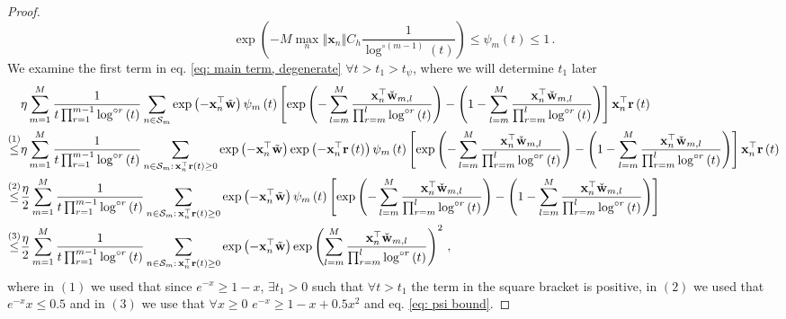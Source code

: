 \documentclass[twoside,11pt,english]{article}
\begin{document}
{\begin{proof}
\begin{equation}
\exp\left(-M\max_{n}\left\Vert \mathbf{x}_{n}\right\Vert C_{h}\frac{1}{\log^{\circ\left(m-1\right)}\left(t\right)}\right)\leq\psi_{m}\left(t\right)\leq1\,.\label{eq: psi bound}
\end{equation}
We examine the first term in eq. \ref{eq: main term, degenerate}
$\forall t>t_{1}>t_{\psi}$, where we will determine $t_{1}$ later
\begin{align*}
 & \eta\sum_{m=1}^{M}\frac{1}{t\prod_{r=1}^{m-1}\log^{\circ r}\left(t\right)}\sum_{n\in\mathcal{S}_{m}}\exp\left(-\mathbf{x}_{n}^{\top}\tilde{\mathbf{w}}\right)\psi_{m}\left(t\right)\left[\exp\left(-\sum_{l=m}^{M}\frac{\mathbf{x}_{n}^{\top}\check{\mathbf{w}}_{m,l}}{\prod_{r=m}^{l}\log^{\circ r}\left(t\right)}\right)-\left(1-\sum_{l=m}^{M}\frac{\mathbf{x}_{n}^{\top}\check{\mathbf{w}}_{m,l}}{\prod_{r=m}^{l}\log^{\circ r}\left(t\right)}\right)\right]\mathbf{x}_{n}^{\top}\mathbf{r}\left(t\right)\,\\
\overset{\left(1\right)}{\leq} & \eta\sum_{m=1}^{M}\frac{1}{t\prod_{r=1}^{m-1}\log^{\circ r}\left(t\right)}\sum_{n\in\mathcal{S}_{m}:\,\mathbf{x}_{n}^{\top}\mathbf{r}\left(t\right)\geq0}\exp\left(-\mathbf{x}_{n}^{\top}\tilde{\mathbf{w}}\right)\exp\left(-\mathbf{x}_{n}^{\top}\mathbf{r}\left(t\right)\right)\psi_{m}\left(t\right)\left[\exp\left(-\sum_{l=m}^{M}\frac{\mathbf{x}_{n}^{\top}\check{\mathbf{w}}_{m,l}}{\prod_{r=m}^{l}\log^{\circ r}\left(t\right)}\right)-\left(1-\sum_{l=m}^{M}\frac{\mathbf{x}_{n}^{\top}\check{\mathbf{w}}_{m,l}}{\prod_{r=m}^{l}\log^{\circ r}\left(t\right)}\right)\right]\mathbf{x}_{n}^{\top}\mathbf{r}\left(t\right)\\
\overset{\left(2\right)}{\leq} & \frac{\eta}{2}\sum_{m=1}^{M}\frac{1}{t\prod_{r=1}^{m-1}\log^{\circ r}\left(t\right)}\sum_{n\in\mathcal{S}_{m}:\,\mathbf{x}_{n}^{\top}\mathbf{r}\left(t\right)\geq0}\exp\left(-\mathbf{x}_{n}^{\top}\tilde{\mathbf{w}}\right)\psi_{m}\left(t\right)\left[\exp\left(-\sum_{l=m}^{M}\frac{\mathbf{x}_{n}^{\top}\check{\mathbf{w}}_{m,l}}{\prod_{r=m}^{l}\log^{\circ r}\left(t\right)}\right)-\left(1-\sum_{l=m}^{M}\frac{\mathbf{x}_{n}^{\top}\check{\mathbf{w}}_{m,l}}{\prod_{r=m}^{l}\log^{\circ r}\left(t\right)}\right)\right]\\
\overset{\left(3\right)}{\leq} & \frac{\eta}{2}\sum_{m=1}^{M}\frac{1}{t\prod_{r=1}^{m-1}\log^{\circ r}\left(t\right)}\sum_{n\in\mathcal{S}_{m}:\,\mathbf{x}_{n}^{\top}\mathbf{r}\left(t\right)\geq0}\exp\left(-\mathbf{x}_{n}^{\top}\tilde{\mathbf{w}}\right)\exp\left(\sum_{l=m}^{M}\frac{\mathbf{x}_{n}^{\top}\check{\mathbf{w}}_{m,l}}{\prod_{r=m}^{l}\log^{\circ r}\left(t\right)}\right)^{2}\,,
\end{align*}
where in $\left(1\right)$ we used that since $e^{-x}\geq1-x$, $\exists t_{1}>0$
such that $\forall t>t_{1}$ the term in the square bracket is positive,
in $\left(2\right)$ we used that $e^{-x}x\leq0.5$ and in $\left(3\right)$
we use that $\forall x\geq0$ $e^{-x}\geq1-x+0.5x^{2}$ and eq. \ref{eq: psi bound}.


\end{proof}}
\end{document}
